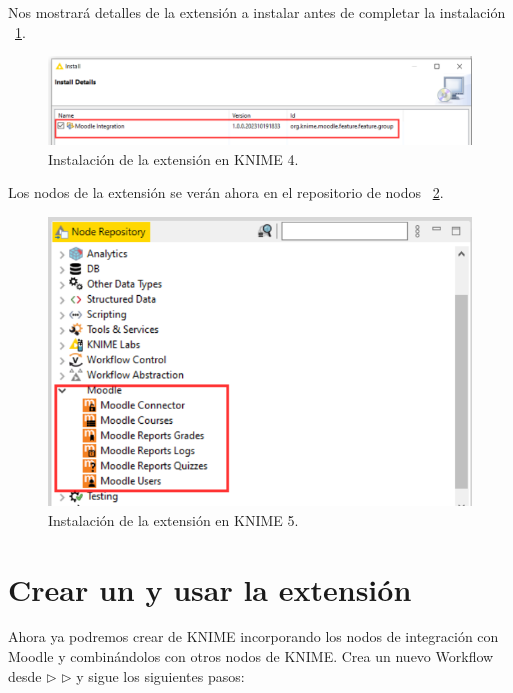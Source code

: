Nos mostrará detalles de la extensión a instalar antes de completar la instalación ~\ref{fig:usuario4}. 

\begin{figure}[!htb]
	\centering
	\includegraphics[width=1\textwidth]{img/manual_usuario_install_site_update4.png}
	\caption{Instalación de la extensión  en KNIME 4.}
	\label{fig:usuario4}
\end{figure}
\FloatBarrier

Los nodos de la extensión  se verán ahora en el repositorio de nodos ~\ref{fig:usuario5}. 

\begin{figure}[!htb]
	\centering
	\includegraphics[width=1\textwidth]{img/manual_usuario_install_site_update5.png}
	\caption{Instalación de la extensión  en KNIME 5.}
	\label{fig:usuario5}
\end{figure}
\FloatBarrier

\hphantom{ }

\newpage
\section{Crear un  y usar la extensión}

Ahora ya podremos crear  de KNIME incorporando los nodos de integración con Moodle y 
combinándolos con otros nodos de KNIME. Crea un nuevo Workflow desde  $\triangleright$  $\triangleright$  y sigue los siguientes pasos:  
\

